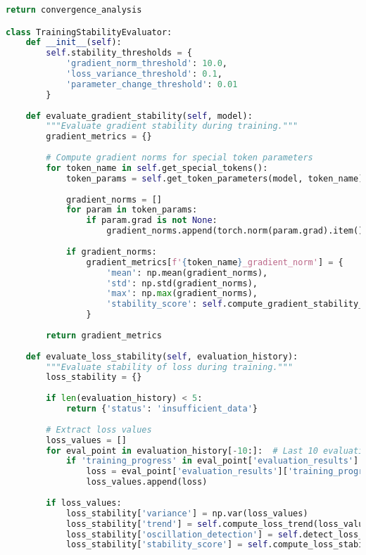 \begin{lstlisting}[language=Python, caption=Comprehensive evaluation metrics framework for special token training]
        return convergence_analysis

class TrainingStabilityEvaluator:
    def __init__(self):
        self.stability_thresholds = {
            'gradient_norm_threshold': 10.0,
            'loss_variance_threshold': 0.1,
            'parameter_change_threshold': 0.01
        }
    
    def evaluate_gradient_stability(self, model):
        """Evaluate gradient stability during training."""
        gradient_metrics = {}
        
        # Compute gradient norms for special token parameters
        for token_name in self.get_special_tokens():
            token_params = self.get_token_parameters(model, token_name)
            
            gradient_norms = []
            for param in token_params:
                if param.grad is not None:
                    gradient_norms.append(torch.norm(param.grad).item())
            
            if gradient_norms:
                gradient_metrics[f'{token_name}_gradient_norm'] = {
                    'mean': np.mean(gradient_norms),
                    'std': np.std(gradient_norms),
                    'max': np.max(gradient_norms),
                    'stability_score': self.compute_gradient_stability_score(gradient_norms)
                }
        
        return gradient_metrics
    
    def evaluate_loss_stability(self, evaluation_history):
        """Evaluate stability of loss during training."""
        loss_stability = {}
        
        if len(evaluation_history) < 5:
            return {'status': 'insufficient_data'}
        
        # Extract loss values
        loss_values = []
        for eval_point in evaluation_history[-10:]:  # Last 10 evaluations
            if 'training_progress' in eval_point['evaluation_results']:
                loss = eval_point['evaluation_results']['training_progress'].get('loss', 0)
                loss_values.append(loss)
        
        if loss_values:
            loss_stability['variance'] = np.var(loss_values)
            loss_stability['trend'] = self.compute_loss_trend(loss_values)
            loss_stability['oscillation_detection'] = self.detect_loss_oscillations(loss_values)
            loss_stability['stability_score'] = self.compute_loss_stability_score(loss_values)
        

\end{lstlisting}
